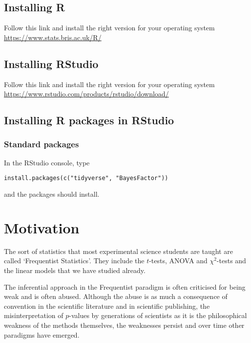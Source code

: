 \documentclass[
]{book}
\begin{document}
\hypertarget{installing-r}{%
\section{Installing R}\label{installing-r}}

Follow this link and install the right version for your operating system \url{https://www.stats.bris.ac.uk/R/}

\hypertarget{installing-rstudio}{%
\section{Installing RStudio}\label{installing-rstudio}}

Follow this link and install the right version for your operating system \url{https://www.rstudio.com/products/rstudio/download/}

\hypertarget{installing-r-packages-in-rstudio}{%
\section{Installing R packages in RStudio}\label{installing-r-packages-in-rstudio}}

\hypertarget{standard-packages}{%
\subsection{Standard packages}\label{standard-packages}}

In the RStudio console, type

\texttt{install.packages(c("tidyverse",\ "BayesFactor"))}

and the packages should install.

\hypertarget{motivation}{%
\chapter{Motivation}\label{motivation}}

The sort of statistics that most experimental science students are taught are called `Frequentist Statistics'. They include the \(t\)-tests, ANOVA and \(\chi^2\)-tests and the linear models that we have studied already.

The inferential approach in the Frequentist paradigm is often criticised for being weak and is often abused. Although the abuse is as much a consequence of convention in the scientific literature and in scientific publishing, the misinterpretation of \(p\)-values by generations of scientists as it is the philosophical weakness of the methods themselves, the weaknesses persist and over time other paradigms have emerged.
\end{document}
